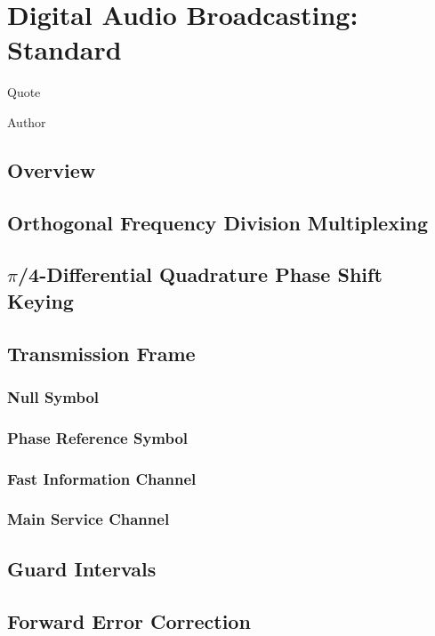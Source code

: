 \documentclass[class=report,11pt,crop=false]{standalone}
\begin{document}
\chapter{Digital Audio Broadcasting: Standard}
\epigraph{Quote}%
{Author}

\section{Overview}
\blindtext

\section{Orthogonal Frequency Division Multiplexing}
\blindtext

\section{$\pi$/4-Differential Quadrature Phase Shift Keying}
\blindtext

\section{Transmission Frame}
\blindtext

\subsection{Null Symbol}
\blindtext

\subsection{Phase Reference Symbol}
\blindtext

\subsection{Fast Information Channel}
\blindtext

\subsection{Main Service Channel}
\blindtext

\section{Guard Intervals}
\blindtext

\section{Forward Error Correction}
\blindtext

\ifstandalone

\fi
\end{document}
